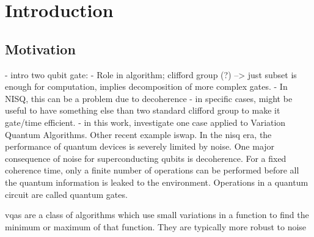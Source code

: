 \newcommand{\package}{\emph}

\chapter{Introduction}
\section{Motivation}

- intro two qubit gate: 
	- Role in algorithm; clifford group (?)  --> just subset is enough for computation, implies decomposition of more complex gates. 
	- In NISQ, this can be a problem due to decoherence
- in specific cases, might be useful to have something else than two standard clifford group to make it gate/time efficient. 
- in this work, investigate one case applied to Variation Quantum Algorithms. Other recent example iswap.
In the \gls{nisq} era, the performance of quantum devices is severely limited by noise. One major consequence of noise for superconducting qubits is decoherence. For a fixed coherence time, only a finite number of operations can be performed before all the quantum information is leaked to the environment. Operations in a quantum circuit are called quantum gates. 

\glspl{vqa} are a class of algorithms which use small variations in a function to find the minimum or maximum of that function. They are typically more robust to noise